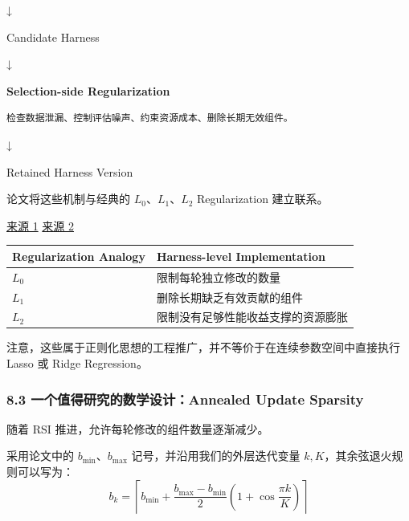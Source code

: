 ↓

Candidate Harness

↓

\textbf{Selection-side Regularization}

\begin{verbatim}
检查数据泄漏、控制评估噪声、约束资源成本、删除长期无效组件。
\end{verbatim}

↓

Retained Harness Version

论文将这些机制与经典的 \(L_0\)、\(L_1\)、\(L_2\) Regularization 建立联系。

\href{https://arxiv.org/html/2609.24972v1}{来源 1} \href{https://arxiv.org/html/2609.24972v1}{来源 2}

\begin{readertable}
\begin{longtable}[]{@{}
  >{\raggedright\arraybackslash}p{}
  >{\raggedright\arraybackslash}p{}@{}}
\toprule
Regularization Analogy & Harness-level Implementation \\
\midrule
\endhead
\(L_0\) & 限制每轮独立修改的数量 \\
\(L_1\) & 删除长期缺乏有效贡献的组件 \\
\(L_2\) & 限制没有足够性能收益支撑的资源膨胀 \\
\bottomrule
\end{longtable}
\end{readertable}

注意，这些属于正则化思想的工程推广，并不等价于在连续参数空间中直接执行 Lasso 或 Ridge Regression。

\hypertarget{part-3-44-0001-ux4e00ux4e2aux503cux5f97ux7814ux7a76ux7684ux6570ux5b66ux8bbeux8ba1annealed-update-sparsity}{%
\subsubsection{8.3 一个值得研究的数学设计：Annealed Update Sparsity}\label{part-3-44-0001-ux4e00ux4e2aux503cux5f97ux7814ux7a76ux7684ux6570ux5b66ux8bbeux8ba1annealed-update-sparsity}}

随着 RSI 推进，允许每轮修改的组件数量逐渐减少。

采用论文中的 \(b_{\min}\)、\(b_{\max}\) 记号，并沿用我们的外层迭代变量 \(k,K\)，其余弦退火规则可以写为：
\[\boxed{
b_k=
\left\lceil
b_{\min}
+
\frac{b_{\max}-b_{\min}}2
\left(1+\cos\frac{\pi k}{K}\right)
\right\rceil
}\]


